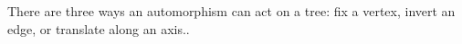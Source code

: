 \documentclass[preview]{standalone}
\begin{document}
\begin{center}
There are three ways an automorphism can act on a tree: fix a vertex, invert an edge, or translate along an axis..\phantom{ttt}
\end{center}
\end{document}
